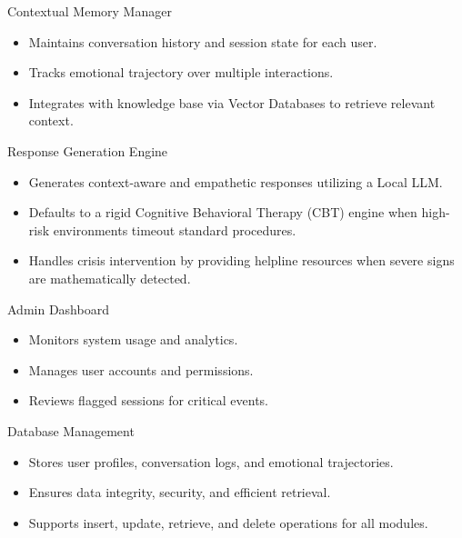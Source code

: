 \documentclass[11pt]{beamer}
\begin{document}
\begin{frame}{Contextual Memory Manager}
\begin{itemize}
    \item Maintains conversation history and session state for each user.
    \item Tracks emotional trajectory over multiple interactions.
    \item Integrates with knowledge base via Vector Databases to retrieve relevant context.
\end{itemize}
\end{frame}

\begin{frame}{Response Generation Engine}
\begin{itemize}
    \item Generates context-aware and empathetic responses utilizing a Local LLM.
    \item Defaults to a rigid Cognitive Behavioral Therapy (CBT) engine when high-risk environments timeout standard procedures.
    \item Handles crisis intervention by providing helpline resources when severe signs are mathematically detected.
\end{itemize}
\end{frame}

\begin{frame}{Admin Dashboard}
\begin{itemize}
    \item Monitors system usage and analytics.
    \item Manages user accounts and permissions.
    \item Reviews flagged sessions for critical events.
\end{itemize}
\end{frame}

\begin{frame}{Database Management}
\begin{itemize}
    \item Stores user profiles, conversation logs, and emotional trajectories.
    \item Ensures data integrity, security, and efficient retrieval.
    \item Supports insert, update, retrieve, and delete operations for all modules.
\end{itemize}
\end{frame}
\end{document}
